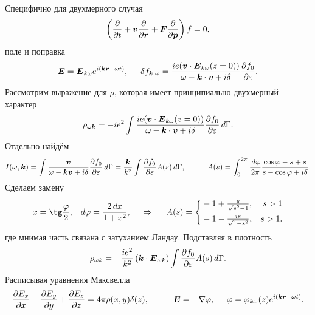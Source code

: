 Специфично для двухмерного случая
\begin{equation*}
	\left(
		\frac{\partial }{\partial t} + \boldsymbol{v} \frac{\partial }{\partial \boldsymbol{r}} + \boldsymbol{F} \frac{\partial }{\partial \boldsymbol{p}} 
	\right) f = 0,
\end{equation*}
поле и поправка
\begin{equation*}
	\boldsymbol{E} = \boldsymbol{E}_{k \omega} e^{i(\boldsymbol{k} \boldsymbol{r} - \omega t)},
	\hspace{5 mm} 
	\delta f_{\boldsymbol{k}, \omega} = \frac{i e (\boldsymbol{v} \cdot \boldsymbol{E}_{k \omega}(z=0))}{\omega - \boldsymbol{k} \cdot \boldsymbol{v} + i \delta} \frac{\partial f_0}{\partial \varepsilon}.
\end{equation*}
Рассмотрим выражение для $\rho$, которая имеет принципиально двухмерный характер
\begin{equation*}
	\rho_{\omega \boldsymbol{k}} = - i e^2 \int \frac{i e (\boldsymbol{v} \cdot \boldsymbol{E}_{k \omega}(z=0))}{\omega - \boldsymbol{k} \cdot \boldsymbol{v} + i \delta} \frac{\partial f_0}{\partial \varepsilon} \, d \Gamma.
\end{equation*}
Отдельно найдём
\begin{equation*}
	I(\omega, \vc{k}) = \int \frac{\vc{v}}{\omega - \vc{k} \vc{v} + i \delta} \frac{\partial f_0}{\partial \varepsilon}  \d \Gamma = \frac{\vc{k}}{k^2} \int \frac{\partial f_0}{\partial \varepsilon} A(s) \d \Gamma,
	\hspace{10 mm} 
	A(s) = \int_{0}^{2\pi} \frac{\d \varphi}{2\pi} \frac{\cos \varphi-s+s}{s- \cos \varphi + i \delta}.
\end{equation*}
Сделаем замену
\begin{equation*}
	x = \tg \frac{\varphi}{2}, \ \ \d \varphi = \frac{2 \d x}{1+x^2},
	\hspace{0.5cm} \Rightarrow \hspace{0.5cm}
	A(s) = \left\{\begin{aligned}
	    &-1 + \tfrac{s}{\sqrt{s^2-1}}, &s>1 \\
	    &-1  - \tfrac{i s}{\sqrt{1-s^2}}, &s>1.
	\end{aligned}\right.
\end{equation*}
где мнимая часть связана с затуханием Ландау. Подставляя в плотность
\begin{equation*}
	\rho_{\omega k} = - \frac{i e^2}{k^2} \left(
		\boldsymbol{k} \cdot \boldsymbol{E}_{\omega k}
	\right) \int \frac{\partial f_0}{\partial \varepsilon} A(s) \, d \Gamma.
\end{equation*}
Расписывая уравнения Максвелла	
\begin{equation*}
	\frac{\partial E_x}{\partial x}  + \frac{\partial E_y}{\partial y} + \frac{\partial E_z}{\partial z} = 4 \pi \rho (x, y) \delta(z),
	\hspace{10 mm} 
	\vc{E} = - \nabla \varphi,
	\hspace{5 mm} 
	\varphi = \varphi_{k \omega} (z) e^{i (\vc{k} \vc{r} -  \omega t)}.
\end{equation*}




